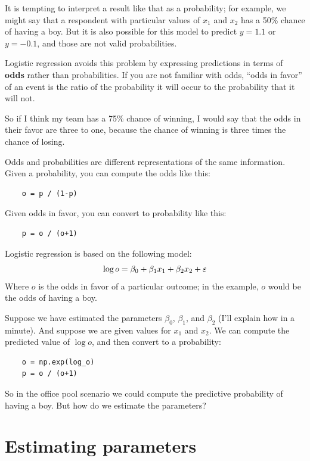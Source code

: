 \documentclass[12pt]{book}
\begin{document}
It is tempting to interpret a result like that as a probability; for
example, we might say that a respondent with particular values of
$x_1$ and $x_2$ has a 50\% chance of having a boy.  But it is also
possible for this model to predict $y=1.1$ or $y=-0.1$, and those
are not valid probabilities.

Logistic regression avoids this problem by expressing predictions in
terms of {\bf odds} rather than probabilities.  If you are not
familiar with odds, ``odds in favor'' of an event is the ratio of the
probability it will occur to the probability that it will not.

So if I think my team has a 75\% chance of winning, I would
say that the odds in their favor are three to one, because
the chance of winning is three times the chance of losing.

Odds and probabilities are different representations of the same
information.  Given a probability, you can compute the odds like this:

\begin{verbatim}
    o = p / (1-p)
\end{verbatim}

Given odds in favor, you can convert to
probability like this:

\begin{verbatim}
    p = o / (o+1)
\end{verbatim}

Logistic regression is based on the following model:
%
\[ \log o = \beta_0 + \beta_1 x_1 + \beta_2 x_2 + \varepsilon \]
%
Where $o$ is the odds in favor of a particular outcome; in the
example, $o$ would be the odds of having a boy.

Suppose we have estimated the parameters $\beta_0$, $\beta_1$, and
$\beta_2$ (I'll explain how in a minute).  And suppose we are given
values for $x_1$ and $x_2$.  We can compute the predicted value of
$\log o$, and then convert to a probability:

\begin{verbatim}
    o = np.exp(log_o)
    p = o / (o+1)
\end{verbatim}

So in the office pool scenario we could compute the predictive
probability of having a boy.  But how do we estimate the parameters?


\section{Estimating parameters}
\end{document}
